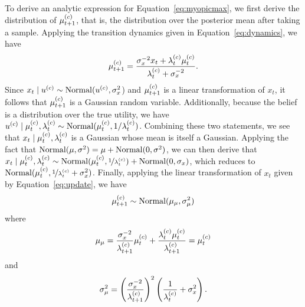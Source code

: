 To derive an analytic expression for Equation~\ref{eq:myopicmax}, we first derive the distribution of $\mu_{t+1}^{(c)}$, that is, the distribution over the posterior mean after taking a sample. Applying the transition dynamics given in Equation~\ref{eq:dynamics}, we have
%
\begin{equation}
  \label{eq:update}
  \mu_{t+1}^{(c)}=\frac
  {\sigma_{x}^{-2}x_t+\lambda_{t}^{(c)}\mu_{t}^{(c)}}
  {\lambda_{t}^{(c)}+\sigma_{x}^{-2}}.
\end{equation}
%
Since $x_t \mid u^{(c)} \sim \mathrm{Normal}(u^{(c)},\sigma_{x}^{2}$) and $\mu_{t+1}^{(c)}$ is a linear transformation of $x_t$, it follows that $\mu_{t+1}^{(c)}$ is a Gaussian random variable. Additionally, because the belief is a distribution over the true utility, we have $u^{(c)} \mid \mu_{t}^{(c)}, \lambda_{t}^{(c)} \sim \mathrm{Normal}(\mu_{t}^{(c)},1/\lambda_{t}^{(c)})$. Combining these two statements, we see that $x_t \mid \mu_{t}^{(c)}, \lambda_{t}^{(c)}$ is a Gaussian whose mean is itself a Gaussian. Applying the fact that $\mathrm{Normal}(\mu, \sigma^2) = \mu + \mathrm{Normal}(0,  \sigma^2)$, we can then derive that $x_t \mid \mu_{t}^{(c)}, \lambda_{t}^{(c)} \sim \mathrm{Normal}(\mu_{t}^{(c)}, \nicefrac{1}{\lambda_{t}^{(c)}}) + \mathrm{Normal}(0, \sigma_x)$, which reduces to $\mathrm{Normal}(\mu_{t}^{(c)}, \nicefrac{1}{\lambda_{t}^{(c)}}+\sigma_{x}^{2})$.
Finally, applying the linear transformation of $x_t$ given by Equation~\ref{eq:update}, we have
%
\begin{equation*}
  \mu_{t+1}^{(c)} \sim
    \mathrm{Normal}(\mu_\mu, \sigma^2_\mu)
\end{equation*}
where
\begin{equation*}
  \mu_\mu =  \frac{\sigma_{x}^{-2}}{\lambda_{t+1}^{(c)}}\mu_{t}^{(c)}+\frac{\lambda_{t}^{(c)}\mu_{t}^{(c)}}{\lambda_{t+1}^{(c)}}=\mu_{t}^{(c)}
\end{equation*}
and
\begin{equation*}
  \sigma^2_\mu = {\left(\frac{\sigma_{x}^{-2}}{\lambda_{t+1}^{(c)}}\right)}^{2}\left(\frac{1}{\lambda_{t}^{(c)}}+\sigma_{x}^{2}\right).
\end{equation*}
%


